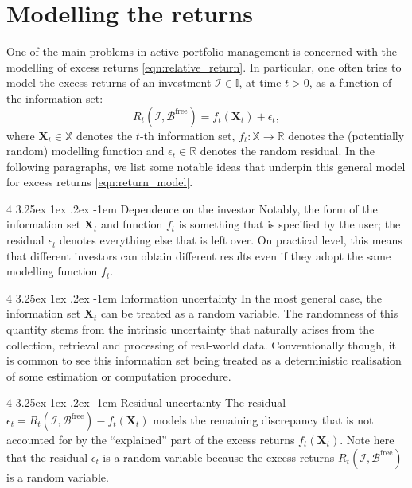 \documentclass[12pt]{article}
\makeatletter
\renewcommand\paragraph{%
	\@startsection{paragraph}
	{4}
	{\z@}
	{3.25ex \@plus1ex \@minus.2ex}
	{-1em}
	{\normalfont\normalsize\bfseries\maybe@addperiod}%
}
\newcommand{\maybe@addperiod}[1]{%
	#1\@addpunct{.}%
}
\makeatother
\begin{document}
\section{Modelling the returns}
One of the main problems in active portfolio management is concerned with the modelling of excess returns \eqref{eqn:relative_return}. In particular, one often tries to model the excess returns of an investment $\mathcal{I} \in \mathbb{I}$, at time $t > 0$, as a function of the information set:
\begin{equation}
    R_t(\mathcal{I}, \mathcal{B}^{\text{free}}) = f_t(\mathbf{X}_t) + \epsilon_t,
    \label{eqn:return_model}
\end{equation}
where $\mathbf{X}_t \in \mathbb{X}$ denotes the $t$-th information set, $f_t: \mathbb{X} \rightarrow \mathbb{R}$ denotes the (potentially random) modelling function and $\epsilon_t \in \mathbb{R}$ denotes the random residual. In the following paragraphs, we list some notable ideas that underpin this general model for excess returns \eqref{eqn:return_model}.

\paragraph{Dependence on the investor} Notably, the form of the information set $\mathbf{X}_t$ and function $f_t$ is something that is specified by the user; the residual $\epsilon_t$ denotes everything else that is left over. On practical level, this means that different investors can obtain different results even if they adopt the same modelling function $f_t$. 

\paragraph{Information uncertainty} In the most general case, the information set $\mathbf{X}_t$ can be treated as a random variable. The randomness of this quantity stems from the intrinsic uncertainty that naturally arises from the collection, retrieval and processing of real-world data. Conventionally though, it is common to see this information set being treated as a deterministic realisation of some estimation or computation procedure.

\paragraph{Residual uncertainty} The residual $\epsilon_t = R_t(\mathcal{I}, \mathcal{B}^{\text{free}}) - f_t(\mathbf{X}_t)$ models the remaining discrepancy that is not accounted for by the ``explained'' part of the excess returns $f_t(\mathbf{X}_t)$. Note here that the residual $\epsilon_t$ is a random variable because the excess returns $R_t(\mathcal{I}, \mathcal{B}^{\text{free}})$ is a random variable.
\end{document}
